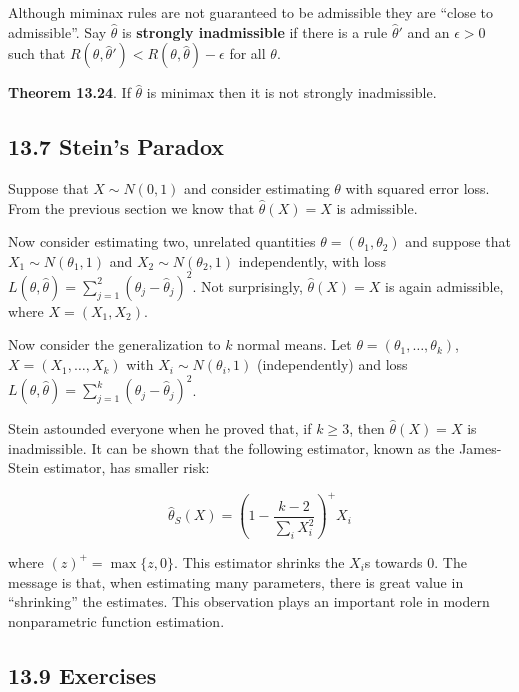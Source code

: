 Although miminax rules are not guaranteed to be admissible they are
``close to admissible''. Say \(\hat{\theta}\) is \textbf{strongly
inadmissible} if there is a rule \(\hat{\theta}'\) and an
\(\epsilon > 0\) such that
\(R(\theta, \hat{\theta}') < R(\theta, \hat{\theta}) - \epsilon\) for
all \(\theta\).

\textbf{Theorem 13.24}. If \(\hat{\theta}\) is minimax then it is not
strongly inadmissible.

\subsection*{13.7 Stein's Paradox}\label{steins-paradox}

Suppose that \(X \sim N(0, 1)\) and consider estimating \(\theta\) with
squared error loss. From the previous section we know that
\(\hat{\theta}(X) = X\) is admissible.

Now consider estimating two, unrelated quantities
\(\theta = (\theta_{1}, \theta_{2})\) and suppose that
\(X_{1} \sim N(\theta_{1}, 1)\) and \(X_{2} \sim N(\theta_{2}, 1)\)
independently, with loss
\(L(\theta, \hat{\theta}) = \sum_{j=1}^{2} (\theta_{j} - \hat{\theta}_{j})^{2}\).
Not surprisingly, \(\hat{\theta}(X) = X\) is again admissible, where
\(X = (X_{1}, X_{2})\).

Now consider the generalization to \(k\) normal means. Let
\(\theta = (\theta_{1}, \dots, \theta_{k})\), \(X = (X_{1}, \dots, X_{k})\) with
\(X_{i} \sim N(\theta_{i}, 1)\) (independently) and loss
\(L(\theta, \hat{\theta}) = \sum_{j=1}^{k} (\theta_{j} - \hat{\theta}_{j})^{2}\).

Stein astounded everyone when he proved that, if \(k \geq 3\), then
\(\hat{\theta}(X) = X\) is inadmissible. It can be shown that the
following estimator, known as the James-Stein estimator, has smaller
risk:

\[\hat{\theta}_S(X) = \left(1 - \frac{k-2}{\sum_{i} X_{i}^{2}} \right)^+ X_{i}\]

where \((z)^+ = \max \{z, 0\}\). This estimator shrinks the \(X_{i}\)s
towards 0. The message is that, when estimating many parameters, there
is great value in ``shrinking'' the estimates. This observation plays an
important role in modern nonparametric function estimation.

\subsection*{13.9 Exercises}

